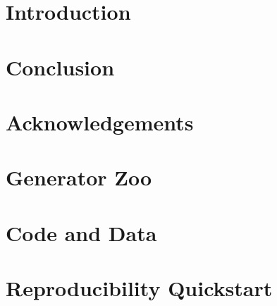 \documentclass[12pt, letterpaper]{article}
\begin{document}
\section{Introduction}



\section{Conclusion}


\section*{Acknowledgements}


\appendix

\section{Generator Zoo}


\section{Code and Data}


\section{Reproducibility Quickstart}




\end{document}
